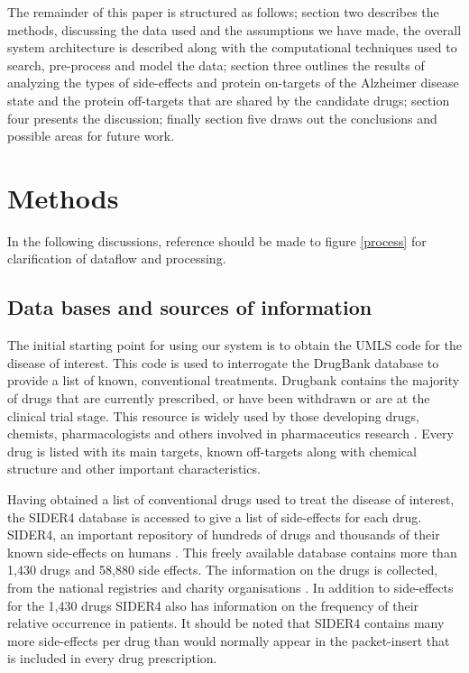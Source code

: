 \documentclass[preprint,11pt]{elsarticle}
\begin{document}
The remainder of this paper is structured as follows; section two describes the methods, discussing the data used and the assumptions we have made, the overall system architecture is described along with the computational techniques used to search, pre-process and model the data; section three outlines the  results of analyzing the types of side-effects and protein on-targets of the Alzheimer disease state and the protein off-targets that are shared by the candidate drugs; section four presents the discussion; finally section five draws out the conclusions and possible areas for future work.


\section{Methods}
In the following discussions, reference should be made to figure \ref{process} for clarification of dataflow and processing.

\subsection{Data bases and sources of information}
The initial starting point for using our system is to obtain the UMLS code for the disease of interest. This code is used to interrogate the DrugBank database to provide a list of known, conventional treatments.  Drugbank contains the majority of drugs that are currently prescribed, or have been withdrawn or are at the clinical trial stage. This resource is widely used by those developing drugs, chemists, pharmacologists and others involved in pharmaceutics research \cite{Law2014}. Every drug is listed with its main targets, known off-targets along with chemical structure and other important characteristics. 

Having obtained a list of conventional  drugs used to treat the disease of interest, the SIDER4 database is  accessed to give a list of side-effects for each drug. SIDER4, an important repository of hundreds of drugs and thousands of their known side-effects on humans \cite{Kuhn2013}. This freely available database contains more than 1,430 drugs and 58,880 side effects. The information on the drugs is collected, from the national registries and charity organisations \cite{Kuhn2010}. In addition to side-effects for the 1,430 drugs SIDER4 also has information on the frequency of their relative occurrence in patients. It should be noted that SIDER4 contains many more side-effects per drug  than would normally appear in the packet-insert that is included in every drug prescription.  
\end{document}
